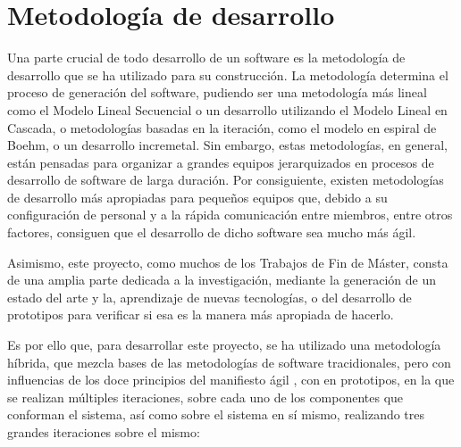 \chapter{Metodología de desarrollo}
\label{metodologiadedesarrollo}

Una parte crucial de todo desarrollo de un software es la metodología de desarrollo que se ha utilizado para su construcción. La metodología determina el proceso de generación del software, pudiendo ser una metodología más lineal como el Modelo Lineal Secuencial o un desarrollo utilizando el Modelo Lineal en Cascada, o metodologías basadas en la iteración, como el modelo en espiral de Boehm, o un desarrollo incremetal. Sin embargo, estas metodologías, en general, están pensadas para organizar a grandes equipos jerarquizados en procesos de desarrollo de software de larga duración. Por consiguiente, existen metodologías de desarrollo más apropiadas para pequeños equipos que, debido a su configuración de personal y a la rápida comunicación entre miembros, entre otros factores, consiguen que el desarrollo de dicho software sea mucho más ágil.

Asimismo, este proyecto, como muchos de los Trabajos de Fin de Máster, consta de una amplia parte dedicada a la investigación, mediante la generación de un estado del arte y la, aprendizaje de nuevas tecnologías, o del desarrollo de prototipos para verificar si esa es la manera más apropiada de hacerlo.

Es por ello que, para desarrollar este proyecto, se ha utilizado una metodología híbrida, que mezcla bases de las metodologías de software tracidionales, pero con influencias de los doce principios del manifiesto ágil \cite{Beck2001}, con en prototipos, en la que se realizan múltiples iteraciones, sobre cada uno de los componentes que conforman el sistema, así como sobre el sistema en sí mismo, realizando tres grandes iteraciones sobre el mismo: 

